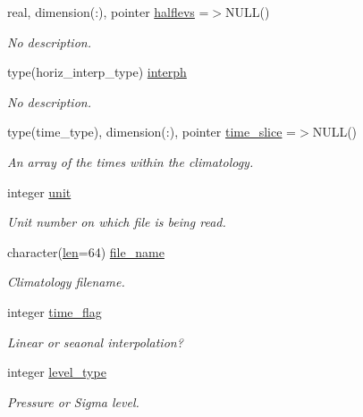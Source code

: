 \begin{DoxyCompactItemize}
real, dimension(\+:), pointer \hyperlink{structinterpolator__mod_1_1interpolate__type_ae760359b9696766024b45cc969081d08}{halflevs} =$>$N\+U\+LL()
\begin{DoxyCompactList}\small\item\em No description. \end{DoxyCompactList}\item 
type(horiz\+\_\+interp\+\_\+type) \hyperlink{structinterpolator__mod_1_1interpolate__type_a0f5d0480dff201de597cb91ea42ba90d}{interph}
\begin{DoxyCompactList}\small\item\em No description. \end{DoxyCompactList}\item 
type(time\+\_\+type), dimension(\+:), pointer \hyperlink{structinterpolator__mod_1_1interpolate__type_a91e808f3c80097c7bec24ab0b7613be4}{time\+\_\+slice} =$>$N\+U\+LL()
\begin{DoxyCompactList}\small\item\em An array of the times within the climatology. \end{DoxyCompactList}\item 
integer \hyperlink{structinterpolator__mod_1_1interpolate__type_ae8fc6840a65ff8cdfd353d1738c413e3}{unit}
\begin{DoxyCompactList}\small\item\em Unit number on which file is being read. \end{DoxyCompactList}\item 
character(\hyperlink{namespaceinterpolator__mod_a6bd2ec3395203e1b6aba0610bfbfe16b}{len}=64) \hyperlink{structinterpolator__mod_1_1interpolate__type_a61ac3f0354a4bbf051d0e6cbb8064849}{file\+\_\+name}
\begin{DoxyCompactList}\small\item\em Climatology filename. \end{DoxyCompactList}\item 
integer \hyperlink{structinterpolator__mod_1_1interpolate__type_ac5138e6458c5e16272c0959ba192e1ee}{time\+\_\+flag}
\begin{DoxyCompactList}\small\item\em Linear or seaonal interpolation? \end{DoxyCompactList}\item 
integer \hyperlink{structinterpolator__mod_1_1interpolate__type_acf6864662d79f232f60044928ecd0854}{level\+\_\+type}
\begin{DoxyCompactList}\small\item\em Pressure or Sigma level. \end{DoxyCompactList}\item 

\end{DoxyCompactItemize}
